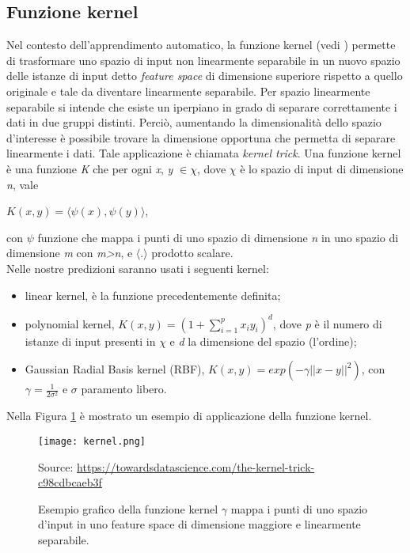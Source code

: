 \subsection{Funzione kernel}
Nel contesto dell'apprendimento automatico, la funzione kernel (vedi \textit{\cite{kernel}}) permette di trasformare uno spazio di input non linearmente separabile in un nuovo spazio delle istanze di input detto \emph{feature space} di dimensione superiore rispetto a quello originale e tale da diventare linearmente separabile. Per spazio linearmente separabile si intende che esiste un iperpiano in grado di separare correttamente i dati in due gruppi distinti. Perciò, aumentando la dimensionalità dello spazio d'interesse è possibile trovare la dimensione opportuna che permetta di separare linearmente i dati. Tale applicazione è chiamata \emph{kernel trick}. Una funzione kernel è una funzione \emph{K} che per ogni \emph{x}, \emph{y} $\in \chi$, dove $\chi$ è lo spazio di input di dimensione \emph{n}, vale 
\begin{center}
	$K(x,y) =  \langle\psi(x),\psi(y)\rangle $,
\end{center}
con $\psi$ funzione che mappa i punti di uno spazio di dimensione \emph{n} in uno spazio di dimensione \emph{m} con \emph{m>n}, e $\langle . \rangle$ prodotto scalare.\\
Nelle nostre predizioni saranno usati i seguenti kernel:
\begin{itemize}
	\item linear kernel, è la funzione precedentemente definita;
	\item polynomial kernel, $K(x,y) =  \left(1 + \sum_{i = 1}^{p}x_iy_i\right)^{d} $, dove \emph{p} è il numero di istanze di input presenti in $\chi$ e \emph{d} la dimensione del spazio (l'ordine);
	\item Gaussian Radial Basis kernel (RBF), $K(x,y) = exp(-\gamma||x-y||^2) $, con $\gamma=\frac{1}{2\sigma^2}$ e $\sigma$ paramento libero. 
\end{itemize}

Nella Figura \ref{fig:kernel} è mostrato un esempio di applicazione della funzione kernel.\\

\begin{figure}[h]
	\begin{center}
		\texttt{[image: kernel.png]}
		\caption{Esempio grafico della funzione kernel $\gamma$ mappa i punti di uno spazio d'input in uno feature space di dimensione maggiore e linearmente separabile.
		} 
		Source: \url{https://towardsdatascience.com/the-kernel-trick-c98cdbcaeb3f}\label{fig:kernel}
	\end{center}
\end{figure}


